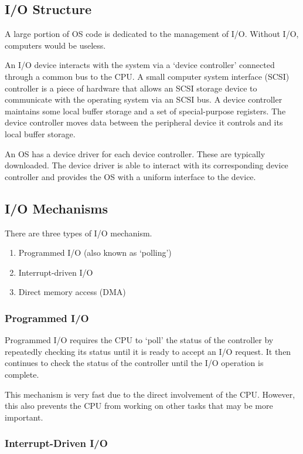 \subsection{I/O Structure}

A large portion of OS code is dedicated to the management of I/O\@.
Without I/O, computers would be useless.

An I/O device interacts with the system via a `device controller' connected through a common bus to the CPU\@.
A small computer system interface (SCSI) controller is a piece of hardware that allows an SCSI storage device to communicate with the operating system via an SCSI bus.
A device controller maintains some local buffer storage and a set of special-purpose registers.
The device controller moves data between the peripheral device it controls and its local buffer storage.

An OS has a device driver for each device controller.
These are typically downloaded.
The device driver is able to interact with its corresponding device controller and provides the OS with a uniform interface to the device.

\subsection{I/O Mechanisms}

There are three types of I/O mechanism.
\begin{enumerate}
  \item Programmed I/O (also known as `polling')
  \item Interrupt-driven I/O
  \item Direct memory access (DMA)
\end{enumerate}

\subsubsection{Programmed I/O}

Programmed I/O requires the CPU to `poll' the status of the controller by repeatedly checking its status until it is ready to accept an I/O request.
It then continues to check the status of the controller until the I/O operation is complete.

This mechanism is very fast due to the direct involvement of the CPU\@.
However, this also prevents the CPU from working on other tasks that may be more important.

\subsubsection{Interrupt-Driven I/O}

